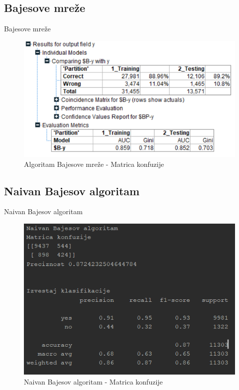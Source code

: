 \documentclass{beamer}
\begin{document}
\subsection{Bajesove mreže}
\begin{frame}{Bajesove mreže}
    \begin{figure}[h!]
                \begin{center}
                \includegraphics[scale=0.60]{Bajes_matrix.png}
                \end{center}
                \caption{Algoritam Bajesove mreže - Matrica konfuzije}
             \end{figure}
\end{frame}

\subsection{Naivan Bajesov algoritam}
\begin{frame}{Naivan Bajesov algoritam}
    \begin{figure}[h!]
                \begin{center}
                \includegraphics[scale=0.60]{naive_B_matrix.png}
                \end{center}
                \caption{Naivan Bajesov algoritam - Matrica konfuzije}
     \end{figure}
\end{frame}
\end{document}
